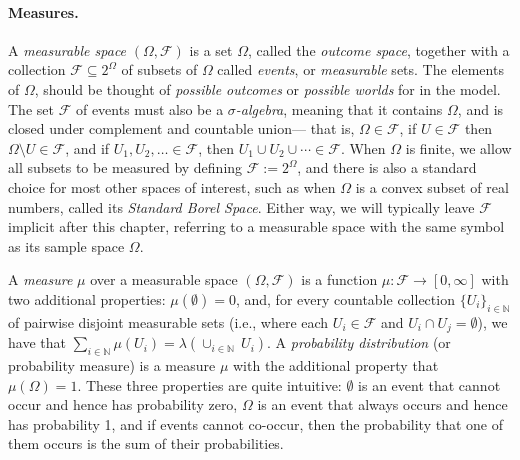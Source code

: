 \paragraph{Measures.}
A \emph{measurable space} $(\Omega, \mathcal F)$ is a set $\Omega$,
called the \emph{outcome space}, together with a collection $\mathcal F \subseteq 2^\Omega$ of subsets of $\Omega$ 
called \emph{events}, or \emph{measurable} sets. 
The elements of $\Omega$, should be thought of \emph{possible outcomes} or \emph{possible worlds} for in the model.
The set $\mathcal F$ of events must also be a \emph{$\sigma$-algebra}, meaning that it contains $\Omega$, and is closed under complement and countable union---%
that is, $\Omega \in \mathcal F$, if $U \in \mathcal F$ then $\Omega \setminus U \in \mathcal F$, and if $U_1, U_2, \ldots \in \mathcal F$, then $U_1 \cup U_2 \cup \cdots \in \mathcal F$.  
When $\Omega$ is finite, we allow all subsets to be measured by defining $\mathcal F := 2^\Omega$,
    and there is also a standard choice for most other spaces of interest, such as when $\Omega$ is a convex subset of real numbers, called its \emph{Standard Borel Space}. 
Either way, we will typically leave $\mathcal F$ implicit after this chapter, referring to a measurable space with the same symbol as its sample space $\Omega$. 

A \emph{measure} $\mu$ over a measurable space $(\Omega, \mathcal F)$ is a function $\mu : \mathcal F \to [0,\infty]$ with two additional properties: $\mu(\emptyset) = 0$, and,
for every countable collection $\{ U_i \}_{i \in \mathbb N}$
of pairwise disjoint measurable sets (i.e., where each $U_i \in \mathcal F$ and $U_i \cap U_j = \emptyset$),  we have that
$\sum_{i \in \mathbb N} \mu(U_i) = \lambda( \cup_{i \in \mathbb N}~U_i)$. 
A \emph{probability distribution} (or probability measure) is a measure $\mu$ with the additional property that $\mu(\Omega) = 1$. 
%
These three properties are quite intuitive: $\emptyset$ is an event that cannot occur and hence has probability zero,
$\Omega$ is an event that always occurs and hence has probability 1, 
and if events cannot co-occur, then the probability that one of them occurs is the sum of their probabilities. 

